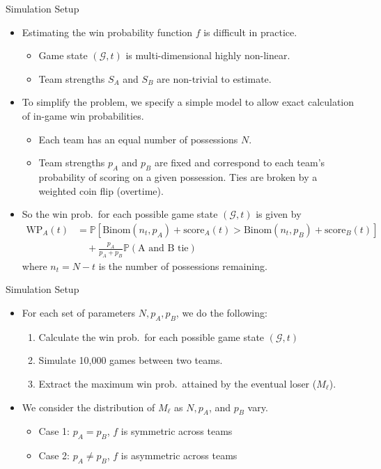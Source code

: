 \documentclass{beamer}
\begin{document}
\begin{frame}{Simulation Setup}
\begin{itemize}
  \item Estimating the win probability function $f$ is difficult in practice.
  \pause
  \begin{itemize}
    \item Game state $(\mathcal{G}, t)$ is multi-dimensional highly non-linear.
    \pause
    \item Team strengths $S_A$ and $S_B$ are non-trivial to estimate.
  \end{itemize}
  \pause
  \item To simplify the problem, we specify a simple model to allow exact calculation of in-game win probabilities.
  \pause
  \begin{itemize}
    \item Each team has an equal number of possessions $N$.
    \pause
    \item Team strengths $p_A$ and $p_B$ are fixed and correspond to each team's probability of scoring on a given possession. Ties are broken by a weighted coin flip (overtime).
  \end{itemize}
  \pause
  \item So the win prob.\ for each possible game state $(\mathcal{G}, t)$ is given by
  \begin{align*}
    \text{WP}_A(t) &= \mathbb{P}\left[\text{Binom}(n_t, p_A) + \text{score}_A(t) > \text{Binom}(n_t, p_B) + \text{score}_B(t)\right] \\
    &\quad + \frac{p_A}{p_A + p_B}\mathbb{P}(\text{A and B tie})
  \end{align*}
  where $n_t = N - t$ is the number of possessions remaining.
\end{itemize}
\end{frame}

\begin{frame}{Simulation Setup}
\begin{itemize}
  \item For each set of parameters $N, p_A, p_B$, we do the following:
  \pause
  \begin{enumerate}
    \item Calculate the win prob.\ for each possible game state $(\mathcal{G}, t)$
    \pause
    \item Simulate 10,000 games between two teams.
    \pause
    \item Extract the maximum win prob.\ attained by the eventual loser ($M_\ell$).
  \end{enumerate}
  \pause
  \item We consider the distribution of $M_\ell$ as $N, p_A$, and $p_B$ vary.
  \pause
  \begin{itemize}
    \item Case 1: $p_A = p_B$, $f$ is symmetric across teams
    \pause
    \item Case 2: $p_A \neq p_B$, $f$ is asymmetric across teams
  \end{itemize}
\end{itemize}
\end{frame}
\end{document}
